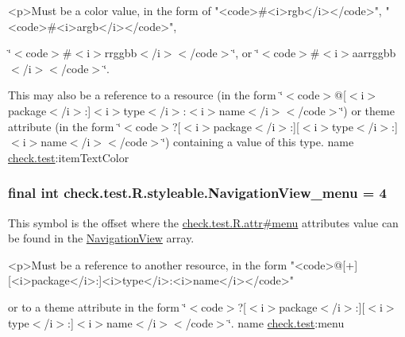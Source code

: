\begin{DoxyVerb}      <p>Must be a color value, in the form of "<code>#<i>rgb</i></code>", "<code>#<i>argb</i></code>",
\end{DoxyVerb}
 \char`\"{}$<$code$>$\#$<$i$>$rrggbb$<$/i$>$$<$/code$>$\char`\"{}, or \char`\"{}$<$code$>$\#$<$i$>$aarrggbb$<$/i$>$$<$/code$>$\char`\"{}. 

This may also be a reference to a resource (in the form \char`\"{}$<$code$>$@\mbox{[}$<$i$>$package$<$/i$>$\+:\mbox{]}$<$i$>$type$<$/i$>$\+:$<$i$>$name$<$/i$>$$<$/code$>$\char`\"{}) or theme attribute (in the form \char`\"{}$<$code$>$?\mbox{[}$<$i$>$package$<$/i$>$\+:\mbox{]}\mbox{[}$<$i$>$type$<$/i$>$\+:\mbox{]}$<$i$>$name$<$/i$>$$<$/code$>$\char`\"{}) containing a value of this type.  name \hyperlink{namespacecheck_1_1test}{check.\+test}\+:item\+Text\+Color \hypertarget{classcheck_1_1test_1_1_r_1_1styleable_a96d0c1fc480a50b365523e0530106f73}{}
\subsubsection[{Navigation\+View\+\_\+menu}]{\setlength{\rightskip}{0pt plus 5cm}final int check.\+test.\+R.\+styleable.\+Navigation\+View\+\_\+menu = 4\hspace{0.3cm}{\ttfamily [static]}}\label{classcheck_1_1test_1_1_r_1_1styleable_a96d0c1fc480a50b365523e0530106f73}
This symbol is the offset where the \hyperlink{classcheck_1_1test_1_1_r_1_1attr_ae21b02ab52e1c279c8bcb58948757072}{check.\+test.\+R.\+attr\#menu} attribute\textquotesingle{}s value can be found in the \hyperlink{classcheck_1_1test_1_1_r_1_1styleable_a70ac59d722f1e4aac4b206dcf5f53107}{Navigation\+View} array.

\begin{DoxyVerb}      <p>Must be a reference to another resource, in the form "<code>@[+][<i>package</i>:]<i>type</i>:<i>name</i></code>"
\end{DoxyVerb}
 or to a theme attribute in the form \char`\"{}$<$code$>$?\mbox{[}$<$i$>$package$<$/i$>$\+:\mbox{]}\mbox{[}$<$i$>$type$<$/i$>$\+:\mbox{]}$<$i$>$name$<$/i$>$$<$/code$>$\char`\"{}.  name \hyperlink{namespacecheck_1_1test}{check.\+test}\+:menu \hypertarget{classcheck_1_1test_1_1_r_1_1styleable_a288d8e82cd6f78d38522b3bd6c8acc55}{}
